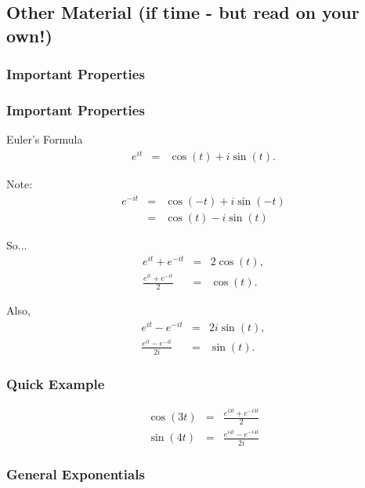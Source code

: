 \subsection{Other Material (if time - but read on your own!)}

\subsubsection{Important Properties}

\begin{frame}
  \frametitle{Important Properties}

  Euler's Formula
  \begin{eqnarray*}
    e^{it} & = & \cos(t) + i\sin(t). 
  \end{eqnarray*}

  Note:
  \begin{eqnarray*}
    e^{-it} & = & \cos(-t) + i\sin(-t) \\
    & = & \cos(t) - i\sin(t)
  \end{eqnarray*}

  So...
  \begin{eqnarray*}
    e^{it} + e^{-it} & = & 2 \cos(t), \\
    \frac{e^{it} + e^{-it}}{2} & = & \cos(t).
  \end{eqnarray*}

  Also,
  \begin{eqnarray*}
    e^{it} - e^{-it} & = & 2 i \sin(t), \\
    \frac{e^{it} - e^{-it}}{2i} & = & \sin(t).
  \end{eqnarray*}



\end{frame}


\begin{frame}
  \frametitle{Quick Example}

  \begin{eqnarray*}
    \cos(3t) & = & \frac{e^{i3t}+e^{-i3t}}{2} \\
    \sin(4t) & = & \frac{e^{i4t}-e^{-i4t}}{2i}
  \end{eqnarray*}

\end{frame}

\subsubsection{General Exponentials}

